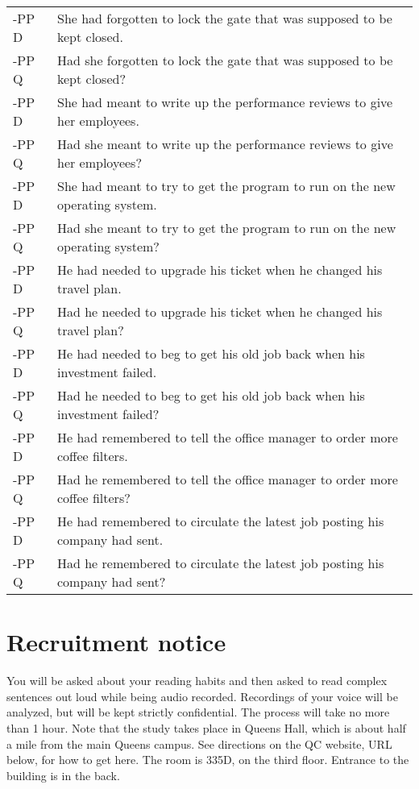 \documentclass[11pt,oneside]{book}
\begin{document}
\begin{longtable}{ll}
\addlinespace
-PP D & She had forgotten to lock the gate that was supposed to be kept closed.\\
-PP Q & Had she forgotten to lock the gate that was supposed to be kept closed?\\
\addlinespace
-PP D & She had meant to write up the performance reviews to give her employees.\\
-PP Q & Had she meant to write up the performance reviews to give her employees?\\
\addlinespace
-PP D & She had meant to try to get the program to run on the new operating system.\\
-PP Q & Had she meant to try to get the program to run on the new operating system?\\
\addlinespace
-PP D & He had needed to upgrade his ticket when he changed his travel plan.\\
-PP Q & Had he needed to upgrade his ticket when he changed his travel plan?\\
\addlinespace
-PP D & He had needed to beg to get his old job back when his investment failed.\\
-PP Q & Had he needed to beg to get his old job back when his investment failed?\\
\addlinespace
-PP D & He had remembered to tell the office manager to order more coffee filters.\\
-PP Q & Had he remembered to tell the office manager to order more coffee filters?\\
\addlinespace
-PP D & He had remembered to circulate the latest job posting his company had sent.\\
-PP Q & Had he remembered to circulate the latest job posting his company had sent?\\*
\end{longtable}

\newpage

\hypertarget{rec}{%
\chapter{Recruitment notice}\label{rec}}

You will be asked about your reading habits and then asked to read complex sentences out loud while being audio recorded. Recordings of your voice will be analyzed, but will be kept strictly confidential. The process will take no more than 1 hour. Note that the study takes place in Queens Hall, which is about half a mile from the main Queens campus. See directions on the QC website, URL below, for how to get here. The room is 335D, on the third floor. Entrance to the building is in the back.
\end{document}
